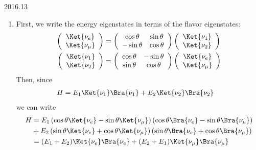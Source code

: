 \documentclass[12pt]{article}
\begin{document}
\begin{solution}{2016.13}
\begin{enumerate}
\item
First, we write the energy eigenstates in terms of the flavor eigenstates:
\begin{align*}
\left( \begin{array}{c}
\Ket{\nu_e} \\
\Ket{\nu_\mu} \\
\end{array} \right) & = \left( \begin{array}{cc}
\cos \theta & \sin \theta \\
-\sin \theta & \cos \theta \\
\end{array} \right) \left( \begin{array}{c}
\Ket{\nu_1} \\
\Ket{\nu_2} \\
\end{array} \right) \\
\left( \begin{array}{c}
\Ket{\nu_1} \\
\Ket{\nu_2} \\
\end{array} \right) & = \left( \begin{array}{cc}
\cos \theta & -\sin \theta \\
\sin \theta & \cos \theta \\
\end{array} \right) \left( \begin{array}{c}
\Ket{\nu_e} \\
\Ket{\nu_\mu} \\
\end{array} \right)
\end{align*}
Then, since
\begin{align*}
H & = E_1 \Ket{\nu_1} \Bra{\nu_1} + E_2 \Ket{\nu_2} \Bra{\nu_2}
\end{align*}
we can write
\begin{align*}
H & = E_1 \left( \cos \theta \Ket{\nu_e} - \sin \theta \Ket{\nu_\mu} \right)
\left( \cos \theta \Bra{\nu_e} - \sin \theta \Bra{\nu_\mu} \right) \\
& + E_2 \left( \sin \theta \Ket{\nu_e} + \cos \theta \Ket{\nu_\mu} \right)
\left( \sin \theta \Bra{\nu_e} + \cos \theta \Bra{\nu_\mu} \right) \\
& = (E_1 + E_2) \Ket{\nu_e} \Bra{\nu_e} + (E_2 + E_1) \Ket{\nu_\mu} \Bra{\nu_\mu} \\

\end{align*}
\end{enumerate}
\end{solution}
\end{document}
